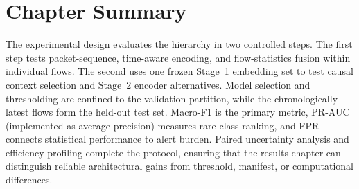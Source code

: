 \section{Chapter Summary}
\label{subsec:experimental_methodology_summary}

The experimental design evaluates the hierarchy in two controlled steps. The
first step tests packet-sequence, time-aware encoding, and flow-statistics
fusion within individual flows. The second uses one frozen Stage~1 embedding
set to test causal context selection and Stage~2 encoder alternatives. Model
selection and thresholding are confined to the validation partition, while the
chronologically latest flows form the held-out test set. Macro-F1 is the primary
metric, PR-AUC (implemented as average precision) measures rare-class ranking,
and FPR connects statistical performance to alert burden. Paired uncertainty
analysis and efficiency profiling complete the protocol, ensuring that the
results chapter can distinguish reliable architectural gains from threshold,
manifest, or computational differences.
